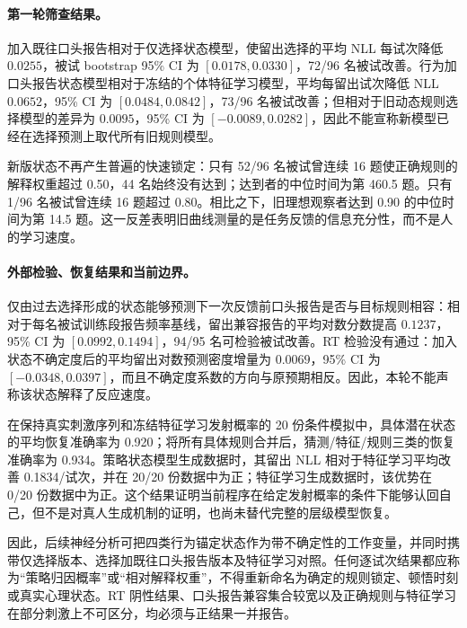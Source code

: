 \paragraph{第一轮筛查结果。}
加入既往口头报告相对于仅选择状态模型，使留出选择的平均 NLL 每试次降低 $0.0255$，被试 bootstrap 95\% CI 为 $[0.0178,0.0330]$，72/96 名被试改善。行为加口头报告状态模型相对于冻结的个体特征学习模型，平均每留出试次降低 NLL $0.0652$，95\% CI 为 $[0.0484,0.0842]$，73/96 名被试改善；但相对于旧动态规则选择模型的差异为 $0.0095$，95\% CI 为 $[-0.0089,0.0282]$，因此不能宣称新模型已经在选择预测上取代所有旧规则模型。

新版状态不再产生普遍的快速锁定：只有 52/96 名被试曾连续 16 题使正确规则的解释权重超过 0.50，44 名始终没有达到；达到者的中位时间为第 460.5 题。只有 1/96 名被试曾连续 16 题超过 0.80。相比之下，旧理想观察者达到 0.90 的中位时间为第 14.5 题。这一反差表明旧曲线测量的是任务反馈的信息充分性，而不是人的学习速度。

\paragraph{外部检验、恢复结果和当前边界。}
仅由过去选择形成的状态能够预测下一次反馈前口头报告是否与目标规则相容：相对于每名被试训练段报告频率基线，留出兼容报告的平均对数分数提高 $0.1237$，95\% CI 为 $[0.0992,0.1494]$，94/95 名可检验被试改善。RT 检验没有通过：加入状态不确定度后的平均留出对数预测密度增量为 $0.0069$，95\% CI 为 $[-0.0348,0.0397]$，而且不确定度系数的方向与原预期相反。因此，本轮不能声称该状态解释了反应速度。

在保持真实刺激序列和冻结特征学习发射概率的 20 份条件模拟中，具体潜在状态的平均恢复准确率为 0.920；将所有具体规则合并后，猜测/特征/规则三类的恢复准确率为 0.934。策略状态模型生成数据时，其留出 NLL 相对于特征学习平均改善 0.1834/试次，并在 20/20 份数据中为正；特征学习生成数据时，该优势在 0/20 份数据中为正。这个结果证明当前程序在给定发射概率的条件下能够认回自己，但不是对真人生成机制的证明，也尚未替代完整的层级模型恢复。

因此，后续神经分析可把四类行为锚定状态作为带不确定性的工作变量，并同时携带仅选择版本、选择加既往口头报告版本及特征学习对照。任何逐试次结果都应称为“策略归因概率”或“相对解释权重”，不得重新命名为确定的规则锁定、顿悟时刻或真实心理状态。RT 阴性结果、口头报告兼容集合较宽以及正确规则与特征学习在部分刺激上不可区分，均必须与正结果一并报告。
